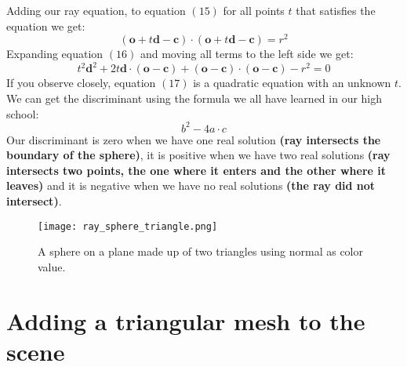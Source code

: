 \documentclass[11pt,a4paper]{article}
\begin{document}
	Adding our ray equation, to equation $(15)$ for all points $t$ that satisfies the equation we get:
	\begin{equation}
		(\boldsymbol{o} + t\boldsymbol{d}-\boldsymbol{c})\cdot(\boldsymbol{o} + t\boldsymbol{d}-\boldsymbol{c})=r^2
	\end{equation}
	Expanding equation $(16)$ and moving all terms to the left side we get:
	\begin{equation}
		t^2\boldsymbol{d}^2 + 2t\boldsymbol{d}\cdot(\boldsymbol{o} - \boldsymbol{c})+(\boldsymbol{o}-\boldsymbol{c})\cdot(\boldsymbol{o}-\boldsymbol{c})-r^2=0
	\end{equation}
	If you observe closely, equation $(17)$ is a quadratic equation with an unknown $t$. We can get the discriminant using the formula we all have learned in our high school:
	\begin{equation}
		b^2-4a \cdot c
	\end{equation}
	Our discriminant is zero when we have one real solution \textbf{(ray intersects the boundary of the sphere)}, it is positive when we have two real solutions \textbf{(ray intersects two points, the one where it enters and the other where it leaves)} and it is negative when we have no real solutions \textbf{(the ray did not intersect)}.
	
	\begin{figure}[htp]
		\centering
		\texttt{[image: ray\_sphere\_triangle.png]}\quad
		\caption{A sphere on a plane made up of two triangles using normal as color value.}
	\end{figure}
	
	\section{Adding a triangular mesh to the scene}
	
	\begingroup
	\setlength{\intextsep}{0pt}
	\setlength{\columnsep}{15pt}
	
\end{document}
